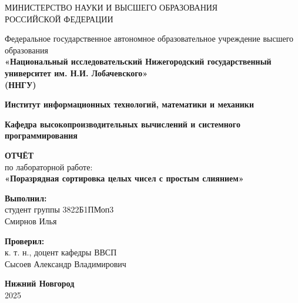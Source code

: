 \documentclass[a4paper,12pt]{article}
\begin{document}
\begin{titlepage}
\centering
{МИНИСТЕРСТВО НАУКИ И ВЫСШЕГО ОБРАЗОВАНИЯ\\
РОССИЙСКОЙ ФЕДЕРАЦИИ}

\vspace{1em}

Федеральное государственное автономное образовательное учреждение высшего образования\\
\textbf{«Национальный исследовательский Нижегородский государственный университет им. Н.И. Лобачевского»}\\
\textbf{(ННГУ)}

\vspace{2em}

\textbf{Институт информационных технологий, математики и механики}

\vspace{1em}

\textbf{Кафедра высокопроизводительных вычислений и системного программирования}

\vspace{2em}

\textbf{\Large ОТЧЁТ}\\
по лабораторной работе:\\

\vspace{2em}
\textbf{«Поразрядная сортировка целых чисел с простым слиянием»}

\vspace{4em}
\begin{flushright}
\textbf{Выполнил:}\\[5pt]
студент группы {3822Б1ПМоп3} \\[1em]
{Смирнов Илья}
\end{flushright}

\vspace{1em}

\begin{flushright}
\textbf{Проверил:} \\[5pt]
к. т. н., доцент кафедры ВВСП \\[5pt]
{Сысоев Александр Владимирович}
\end{flushright}

\vspace{1em}

\vfill
\textbf{Нижний Новгород}\\
2025
\end{titlepage}

\tableofcontents
\newpage
\end{document}
